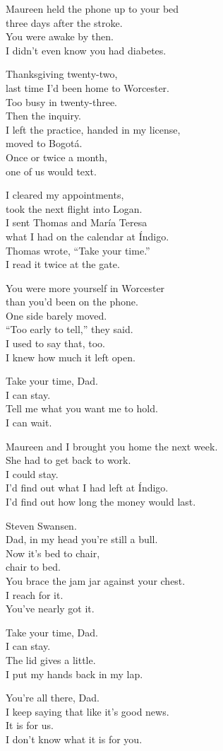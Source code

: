 \begin{lyrics}
Maureen held the phone up to your bed\\
three days after the stroke.\\
You were awake by then.\\
I didn’t even know you had diabetes.

Thanksgiving twenty-two,\\
last time I’d been home to Worcester.\\
Too busy in twenty-three.\\
Then the inquiry.\\
I left the practice, handed in my license,\\
moved to Bogotá.\\
Once or twice a month,\\
one of us would text.

I cleared my appointments,\\
took the next flight into Logan.\\
I sent Thomas and María Teresa\\
what I had on the calendar at Índigo.\\
Thomas wrote, “Take your time.”\\
I read it twice at the gate.

You were more yourself in Worcester\\
than you’d been on the phone.\\
One side barely moved.\\
“Too early to tell,” they said.\\
I used to say that, too.\\
I knew how much it left open.

Take your time, Dad.\\
I can stay.\\
Tell me what you want me to hold.\\
I can wait.

Maureen and I brought you home the next week.\\
She had to get back to work.\\
I could stay.\\
I’d find out what I had left at Índigo.\\
I’d find out how long the money would last.

Steven Swansen.\\
Dad, in my head you’re still a bull.\\
Now it’s bed to chair,\\
chair to bed.\\
You brace the jam jar against your chest.\\
I reach for it.\\
You’ve nearly got it.

Take your time, Dad.\\
I can stay.\\
The lid gives a little.\\
I put my hands back in my lap.

You’re all there, Dad.\\
I keep saying that like it’s good news.\\
It is for us.\\
I don’t know what it is for you.
\end{lyrics}

